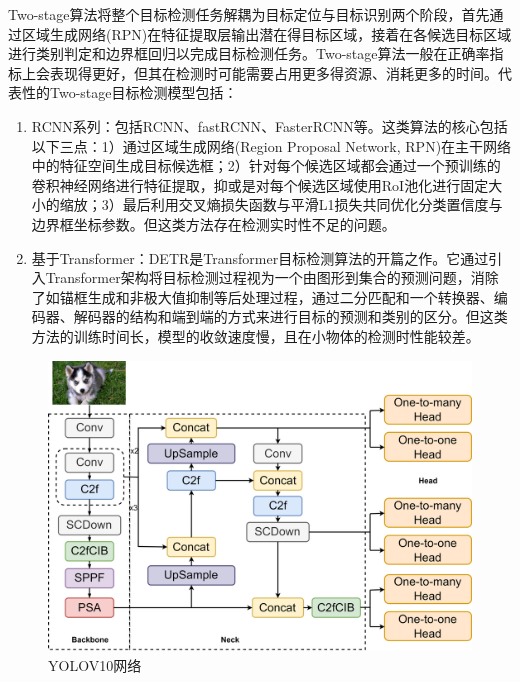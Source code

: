 Two-stage算法将整个目标检测任务解耦为目标定位与目标识别两个阶段，首先通过区域生成网络(RPN)在特征提取层输出潜在得目标区域，接着在各候选目标区域进行类别判定和边界框回归以完成目标检测任务。Two-stage算法一般在正确率指标上会表现得更好，但其在检测时可能需要占用更多得资源、消耗更多的时间。代表性的Two-stage目标检测模型包括：
\begin{enumerate}[topsep = 0 pt, itemsep= 0 pt, parsep=0pt, partopsep=0pt, leftmargin=44pt, itemindent=0pt, labelsep=6pt, label=(\arabic*)]
    \item 	RCNN系列：包括RCNN\cite{girshick2014rich}、fastRCNN\cite{girshick2015fast}、FasterRCNN\cite{ren2016faster}等。这类算法的核心包括以下三点：1）通过区域生成网络(Region Proposal Network, RPN)在主干网络中的特征空间生成目标候选框；2）针对每个候选区域都会通过一个预训练的卷积神经网络进行特征提取，抑或是对每个候选区域使用RoI\cite{doukas2007region}池化进行固定大小的缩放；3）最后利用交叉熵损失函数与平滑L1损失共同优化分类置信度与边界框坐标参数。但这类方法存在检测实时性不足的问题。

    \item	基于Transformer：DETR\cite{carion2020end}是Transformer目标检测算法的开篇之作。它通过引入Transformer架构将目标检测过程视为一个由图形到集合的预测问题，消除了如锚框生成和非极大值抑制等后处理过程，通过二分匹配和一个转换器、编码器、解码器的结构和端到端的方式来进行目标的预测和类别的区分。但这类方法的训练时间长，模型的收敛速度慢，且在小物体的检测时性能较差。
\end{enumerate}

\begin{figure}[htbp]
    \centering
    \includegraphics[scale=0.12]{Fig/yolonet.png}
    \caption{\label{fyolonet}YOLOV10网络}
\end{figure}


